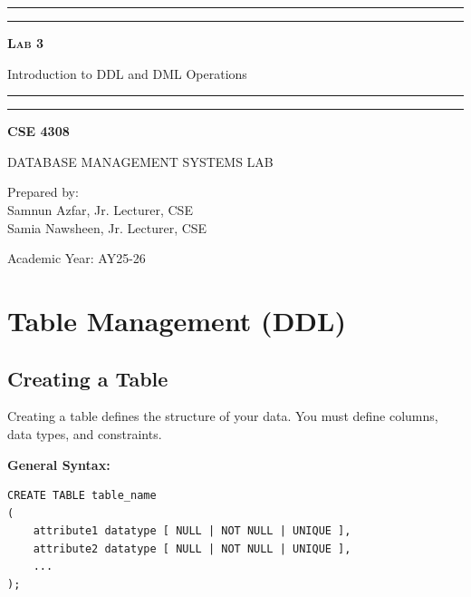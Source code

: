 \documentclass[12pt,a4paper]{article}
\begin{document}
\begin{titlepage}
    \centering
    \vspace*{2\baselineskip}

    \rule{14cm}{2pt}\vspace*{-0.8\baselineskip}\vspace*{1.5pt}
    \rule{14cm}{0.5pt}\vspace{2\baselineskip}

    {\Huge\bfseries\scshape Lab 3\par}
    \vspace{3mm}
    {\Large Introduction to DDL and DML Operations}
    \vspace{3mm}

    \rule{14cm}{0.5pt}\vspace*{-0.7\baselineskip}\vspace{2.5pt}
    \rule{14cm}{2pt}

    \vspace{2\baselineskip}

    {\Large\bfseries CSE 4308\par}
    \vspace{1\baselineskip}
    {\large DATABASE MANAGEMENT SYSTEMS LAB\par}

    \vfill
    {\normalsize Prepared by:\\ Samnun Azfar, Jr. Lecturer, CSE\\ Samia Nawsheen, Jr. Lecturer, CSE\par}
    {\normalsize Academic Year: AY25-26\par}
\end{titlepage}

\newpage

\section{Table Management (DDL)}

\subsection{Creating a Table}
Creating a table defines the structure of your data. You must define columns, data types, and constraints.

\textbf{General Syntax:}
\begin{lstlisting}
CREATE TABLE table_name
(
    attribute1 datatype [ NULL | NOT NULL | UNIQUE ],
    attribute2 datatype [ NULL | NOT NULL | UNIQUE ],
    ...
);
\end{lstlisting}
\end{document}
